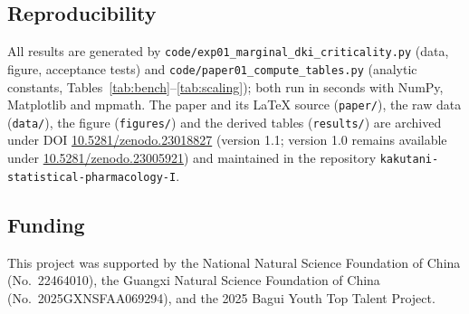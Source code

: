 \documentclass[11pt,reqno]{amsart}
\theoremstyle{plain}
\theoremstyle{definition}
\theoremstyle{remark}
\numberwithin{equation}{section}
\begin{document}
\subsection*{Reproducibility}
\begin{sloppypar}
All results are generated by \texttt{code/exp01\_marginal\_dki\_criticality.py} (data, figure, acceptance tests) and \texttt{code/paper01\_compute\_tables.py} (analytic constants, Tables~\ref{tab:bench}--\ref{tab:scaling}); both run in seconds with NumPy, Matplotlib and mpmath. The paper and its \LaTeX{} source (\texttt{paper/}), the raw data (\texttt{data/}), the figure (\texttt{figures/}) and the derived tables (\texttt{results/}) are archived under DOI \href{https://doi.org/10.5281/zenodo.23018827}{10.5281/zenodo.23018827} (version 1.1; version 1.0 remains available under \href{https://doi.org/10.5281/zenodo.23005921}{10.5281/zenodo.23005921}) and maintained in the repository \texttt{kakutani-statistical-pharmacology-I}.
\end{sloppypar}

\subsection*{Funding}
This project was supported by the National Natural Science Foundation of China (No.~22464010), the Guangxi Natural Science Foundation of China (No.~2025GXNSFAA069294), and the 2025 Bagui Youth Top Talent Project.
\end{document}
